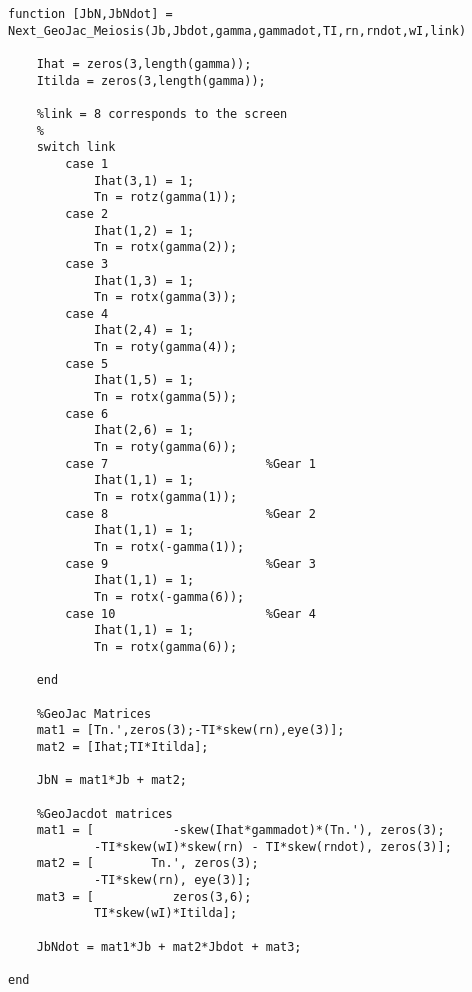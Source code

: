 \begin{lstlisting}[frame=lines,style=Matlab-editor,basicstyle = \mlttfamily, caption=Geometric Jacobian Calculator]
function [JbN,JbNdot] = Next_GeoJac_Meiosis(Jb,Jbdot,gamma,gammadot,TI,rn,rndot,wI,link)

    Ihat = zeros(3,length(gamma));
    Itilda = zeros(3,length(gamma));

    %link = 8 corresponds to the screen
    %
    switch link
        case 1
            Ihat(3,1) = 1;
            Tn = rotz(gamma(1));
        case 2
            Ihat(1,2) = 1;
            Tn = rotx(gamma(2));
        case 3
            Ihat(1,3) = 1;
            Tn = rotx(gamma(3));
        case 4
            Ihat(2,4) = 1;
            Tn = roty(gamma(4));
        case 5
            Ihat(1,5) = 1;
            Tn = rotx(gamma(5));
        case 6
            Ihat(2,6) = 1;
            Tn = roty(gamma(6));
        case 7                      %Gear 1
            Ihat(1,1) = 1;
            Tn = rotx(gamma(1));
        case 8                      %Gear 2
            Ihat(1,1) = 1;
            Tn = rotx(-gamma(1));
        case 9                      %Gear 3
            Ihat(1,1) = 1;
            Tn = rotx(-gamma(6));
        case 10                     %Gear 4
            Ihat(1,1) = 1;
            Tn = rotx(gamma(6));

    end

    %GeoJac Matrices
    mat1 = [Tn.',zeros(3);-TI*skew(rn),eye(3)];
    mat2 = [Ihat;TI*Itilda];

    JbN = mat1*Jb + mat2;

    %GeoJacdot matrices
    mat1 = [           -skew(Ihat*gammadot)*(Tn.'), zeros(3);
            -TI*skew(wI)*skew(rn) - TI*skew(rndot), zeros(3)];
    mat2 = [        Tn.', zeros(3);
            -TI*skew(rn), eye(3)];
    mat3 = [           zeros(3,6);
            TI*skew(wI)*Itilda];

    JbNdot = mat1*Jb + mat2*Jbdot + mat3;

end
\end{lstlisting}

